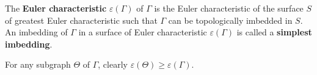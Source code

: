 The \textbf{Euler characteristic} $\varepsilon(\Gamma)$ of $\Gamma$ is the Euler characteristic of the surface $S$ of greatest Euler characteristic such that $\Gamma$ can be topologically imbedded in $S$. An imbedding of $\Gamma$ in a surface of Euler characteristic $\varepsilon(\Gamma)$ is called a \textbf{simplest imbedding}.

For any subgraph $\Theta$ of $\Gamma$, clearly $\varepsilon(\Theta) \geq \varepsilon(\Gamma)$.
